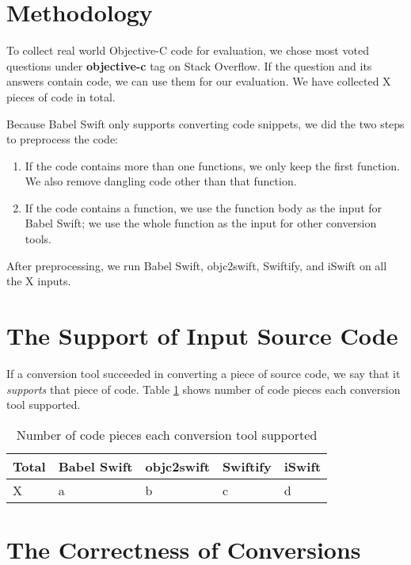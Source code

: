 \documentclass{sfuthesis}
\begin{document}
\section{Methodology}

To collect real world Objective-C code for evaluation, we chose most voted questions under \textbf{objective-c} tag on Stack Overflow. If the question and its answers contain code, we can use them for our evaluation. We have collected X pieces of code in total.

Because Babel Swift only supports converting code snippets, we did the two steps to preprocess the code:

\begin{enumerate}
  \item If the code contains more than one functions, we only keep the first function. We also remove dangling code other than that function.
  \item If the code contains a function, we use the function body as the input for Babel Swift; we use the whole function as the input for other conversion tools.
\end{enumerate}

After preprocessing, we run Babel Swift, objc2swift, Swiftify, and iSwift on all the X inputs.

\section{The Support of Input Source Code}

If a conversion tool succeeded in converting a piece of source code, we say that it \emph{supports} that piece of code. Table \ref{table:numcodesupported} shows number of code pieces each conversion tool supported.

\begin{table}[H]
\begin{center}
\begin{tabular}{|l|l|l|l|l|}
\hline
\textbf{Total} & Babel Swift & objc2swift & Swiftify & iSwift \\
\hline
X & a & b & c & d \\
\hline
\end{tabular}
\end{center}
\caption{Number of code pieces each conversion tool supported}
\label{table:numcodesupported}
\end{table}

\section{The Correctness of Conversions}
\end{document}
